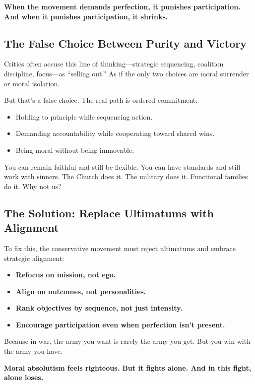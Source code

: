 \textbf{When the movement demands perfection, it punishes participation. And when it punishes participation, it shrinks.}

\subsection*{The False Choice Between Purity and Victory}

Critics often accuse this line of thinking—strategic sequencing, coalition discipline, focus—as “selling out.” As if the only two choices are moral surrender or moral isolation.

But that’s a false choice. The real path is ordered commitment:
\begin{itemize}
    \item Holding to principle while sequencing action.
    \item Demanding accountability while cooperating toward shared wins.
    \item Being moral without being immovable.
\end{itemize}

You can remain faithful and still be flexible. You can have standards and still work with sinners. The Church does it. The military does it. Functional families do it. Why not us?

\subsection*{The Solution: Replace Ultimatums with Alignment}

To fix this, the conservative movement must reject ultimatums and embrace strategic alignment:
\begin{itemize}
    \item \textbf{Refocus on mission, not ego.}
    \item \textbf{Align on outcomes, not personalities.}
    \item \textbf{Rank objectives by sequence, not just intensity.}
    \item \textbf{Encourage participation even when perfection isn’t present.}
\end{itemize}

Because in war, the army you want is rarely the army you get. But you win with the army you have.

\textbf{Moral absolutism feels righteous. But it fights alone. And in this fight, alone loses.}









